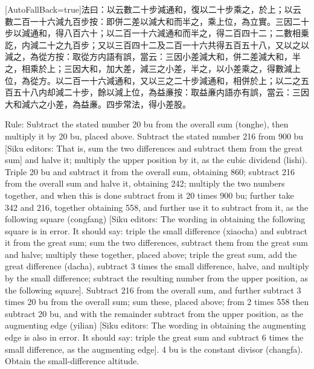 \documentclass[11pt]{article}
\newcommand{\zhsmall}{\footnotesize\color{black!70}}
\newcommand{\unitlabel}[1]{\marginpar{\raggedleft\tiny\color{gray}#1}}
\newenvironment{unitzh}{\par\CJKfontspec{Noto Serif CJK SC}[AutoFallBack=true]\large\linespread{1.25}\selectfont}{\par}
\newenvironment{uniten}{\par\small\color{black!85}}{\par\medskip}
\begin{document}
\begin{unitzh}\unitlabel{ceyuan-027.3}法曰：以云數二十步減通和，復以二十步乘之，於上；以云數二百一十六減九百步{\zhsmall 按：即併二差以減大和}而半之，乘上位，為立實。三因二十步以減通和，得八百六十；以二百一十六減通和而半之，得二百四十二；二數相乗訖，内減二十之九百步；又以三百四十二及二百一十六共得五百五十八，又以之以減之，為從方{\zhsmall 按：取從方内語有誤，當云：三因小差減大和，併二差減大和，半之，相乘於上；三因大和，加大差，減三之小差，半之，以小差乘之，得數減上位，為從方}。以二百一十六減通和，又以三之二十步減通和，相併於上；以二之五百五十八内却減二十步，餘以減上位，為益亷{\zhsmall 按：取益亷内語亦有誤，當云：三因大和減六之小差，為益亷}。四步常法，得小差股。\end{unitzh}
\begin{uniten}Rule: Subtract the stated number 20 bu from the overall sum (tonghe), then multiply it by 20 bu, placed above. Subtract the stated number 216 from 900 bu [Siku editors: That is, sum the two differences and subtract them from the great sum] and halve it; multiply the upper position by it, as the cubic dividend (lishi). Triple 20 bu and subtract it from the overall sum, obtaining 860; subtract 216 from the overall sum and halve it, obtaining 242; multiply the two numbers together, and when this is done subtract from it 20 times 900 bu; further take 342 and 216, together obtaining 558, and further use it to subtract from it, as the following square (congfang) [Siku editors: The wording in obtaining the following square is in error. It should say: triple the small difference (xiaocha) and subtract it from the great sum; sum the two differences, subtract them from the great sum and halve; multiply these together, placed above; triple the great sum, add the great difference (dacha), subtract 3 times the small difference, halve, and multiply by the small difference; subtract the resulting number from the upper position, as the following square]. Subtract 216 from the overall sum, and further subtract 3 times 20 bu from the overall sum; sum these, placed above; from 2 times 558 then subtract 20 bu, and with the remainder subtract from the upper position, as the augmenting edge (yilian) [Siku editors: The wording in obtaining the augmenting edge is also in error. It should say: triple the great sum and subtract 6 times the small difference, as the augmenting edge]. 4 bu is the constant divisor (changfa). Obtain the small-difference altitude.\end{uniten}
\end{document}

